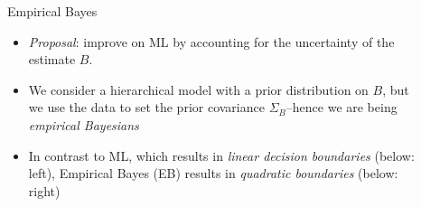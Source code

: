 \documentclass[final]{beamer}
\newlength{\sepwid}
\newlength{\onecolwid}
\begin{document}
\begin{frame}[t]
\begin{columns}[t]
\begin{column}{\onecolwid}

\end{column} %

\begin{column}{\sepwid}\end{column} %


\begin{column}{\onecolwid}

\begin{block}{Empirical Bayes}

\begin{itemize}
\item 
\emph{Proposal}: improve on ML by accounting for the uncertainty of the
estimate $B$.
\item We consider a hierarchical model with a prior
distribution on $B$, but we use the data to set the prior covariance
$\Sigma_B$--hence we are being \emph{empirical Bayesians}
\item In contrast to ML, which results in \emph{linear decision
  boundaries} (below: left), Empirical Bayes (EB) results in \emph{quadratic boundaries} (below: right)
\end{itemize}


\end{block}
\end{column}
\end{columns}
\end{frame}
\end{document}
